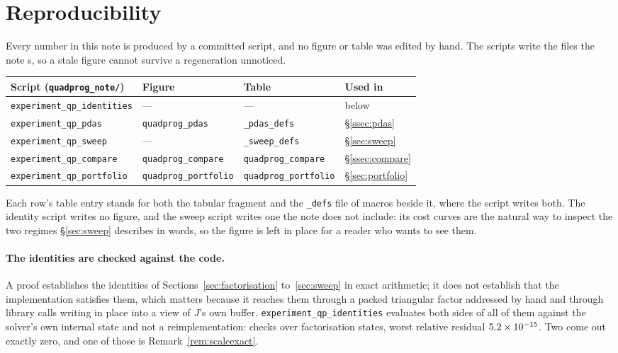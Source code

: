 \section*{Reproducibility}
\label{sec:reproducibility}

Every number in this note is produced by a committed script, and no figure or
table was edited by hand. The scripts write the files the note \verb||s, so
a stale figure cannot survive a regeneration unnoticed.

\begin{center}
\small
\begin{tabular}{@{}llll@{}}
\toprule
Script (\texttt{quadprog\_note/}) & Figure & Table & Used in \\
\midrule
\verb|experiment_qp_identities| & --- & --- & below \\
\verb|experiment_qp_pdas| & \verb|quadprog_pdas|
  & \verb|_pdas_defs| & \S\ref{ssec:pdas} \\
\verb|experiment_qp_sweep| & ---
  & \verb|_sweep_defs| & \S\ref{sec:sweep} \\
\verb|experiment_qp_compare| & \verb|quadprog_compare|
  & \verb|quadprog_compare| & \S\ref{ssec:compare} \\
\verb|experiment_qp_portfolio| & \verb|quadprog_portfolio|
  & \verb|quadprog_portfolio| & \S\ref{sec:portfolio} \\
\bottomrule
\end{tabular}
\end{center}

\noindent
Each row's table entry stands for both the tabular fragment and the
\verb|_defs| file of macros beside it, where the script writes both. The identity
script writes no figure, and the sweep script writes one the note does not
include: its cost curves are the natural way to inspect the two regimes
\S\ref{sec:sweep} describes in words, so the figure is left in place for a reader
who wants to see them.

\paragraph{The identities are checked against the code.} A proof establishes the
identities of Sections~\ref{sec:factorisation} to~\ref{sec:sweep} in exact
arithmetic; it does not establish that the implementation satisfies them, which
matters because it reaches them through a packed triangular factor addressed by
hand and through library calls writing in place into a view of $J$'s own buffer.
\verb|experiment_qp_identities| evaluates both sides of all \qpIdentCount{} of them
against the solver's own internal state and not a reimplementation:
\qpIdentChecks{} checks over \qpIdentStates{} factorisation states, worst relative
residual $5.2\times 10^{-15}$. Two come out exactly zero, and one of those is
Remark~\ref{rem:scaleexact}.

